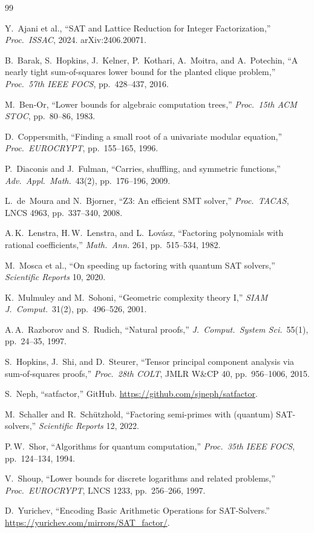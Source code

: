 \documentclass[11pt,a4paper]{article}
\begin{document}

\begin{thebibliography}{99}

 Y.~Ajani et al., ``SAT and Lattice Reduction for Integer Factorization,'' \emph{Proc.\ ISSAC}, 2024. arXiv:2406.20071.

 B.~Barak, S.~Hopkins, J.~Kelner, P.~Kothari, A.~Moitra, and A.~Potechin, ``A nearly tight sum-of-squares lower bound for the planted clique problem,'' \emph{Proc.\ 57th IEEE FOCS}, pp.~428--437, 2016.

 M.~Ben-Or, ``Lower bounds for algebraic computation trees,'' \emph{Proc.\ 15th ACM STOC}, pp.~80--86, 1983.

 D.~Coppersmith, ``Finding a small root of a univariate modular equation,'' \emph{Proc.\ EUROCRYPT}, pp.~155--165, 1996.

 P.~Diaconis and J.~Fulman, ``Carries, shuffling, and symmetric functions,'' \emph{Adv.\ Appl.\ Math.}\ 43(2), pp.~176--196, 2009.

 L.~de~Moura and N.~Bjorner, ``Z3: An efficient SMT solver,'' \emph{Proc.\ TACAS}, LNCS 4963, pp.~337--340, 2008.

 A.\,K.~Lenstra, H.\,W.~Lenstra, and L.~Lov\'{a}sz, ``Factoring polynomials with rational coefficients,'' \emph{Math.\ Ann.} 261, pp.~515--534, 1982.

 M.~Mosca et al., ``On speeding up factoring with quantum SAT solvers,'' \emph{Scientific Reports} 10, 2020.

 K.~Mulmuley and M.~Sohoni, ``Geometric complexity theory I,'' \emph{SIAM J.\ Comput.}\ 31(2), pp.~496--526, 2001.

 A.\,A.~Razborov and S.~Rudich, ``Natural proofs,'' \emph{J.\ Comput.\ System Sci.}\ 55(1), pp.~24--35, 1997.

 S.~Hopkins, J.~Shi, and D.~Steurer, ``Tensor principal component analysis via sum-of-squares proofs,'' \emph{Proc.\ 28th COLT}, JMLR W\&CP 40, pp.~956--1006, 2015.

 S.~Neph, ``satfactor,'' GitHub. \url{https://github.com/sjneph/satfactor}.

 M.~Schaller and R.~Sch\"{u}tzhold, ``Factoring semi-primes with (quantum) SAT-solvers,'' \emph{Scientific Reports} 12, 2022.

 P.\,W.~Shor, ``Algorithms for quantum computation,'' \emph{Proc.\ 35th IEEE FOCS}, pp.~124--134, 1994.

 V.~Shoup, ``Lower bounds for discrete logarithms and related problems,'' \emph{Proc.\ EUROCRYPT}, LNCS 1233, pp.~256--266, 1997.

 D.~Yurichev, ``Encoding Basic Arithmetic Operations for SAT-Solvers.'' \url{https://yurichev.com/mirrors/SAT_factor/}.

\end{thebibliography}
\end{document}
